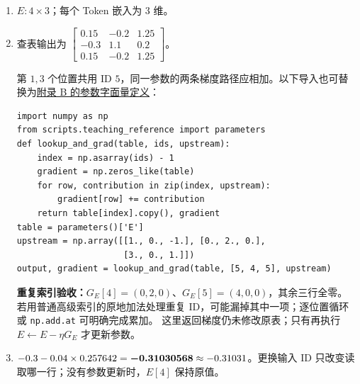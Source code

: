 \begin{enumerate}[label={},leftmargin=4.8em,itemsep=4pt]
\item[\textbf{\hyperref[exercise:embedding-shape]{C-048.}}] \leavevmode{}\label{solution:C-048}\label{solution:embedding-shape}$E:4\times3$；每个 Token 嵌入为 3 维。
\item[\textbf{\hyperref[exercise:embedding-input-change]{C-049.}}] \leavevmode{}\label{solution:C-049}\label{solution:embedding-input-change}查表输出为 $\left[\begin{smallmatrix}0.15&-0.2&1.25\\-0.3&1.1&0.2\\0.15&-0.2&1.25\end{smallmatrix}\right]$。
\par{}第 $1,3$ 个位置共用 ID $5$，同一参数的两条梯度路径应相加。以下导入也可替换为\hyperref[app:parameter-literal]{附录 B 的参数字面量定义}：\par\nobreak
\begin{samepage}\begin{verbatim}
import numpy as np
from scripts.teaching_reference import parameters
def lookup_and_grad(table, ids, upstream):
    index = np.asarray(ids) - 1
    gradient = np.zeros_like(table)
    for row, contribution in zip(index, upstream):
        gradient[row] += contribution
    return table[index].copy(), gradient
table = parameters()['E']
upstream = np.array([[1., 0., -1.], [0., 2., 0.],
                     [3., 0., 1.]])
output, gradient = lookup_and_grad(table, [5, 4, 5], upstream)
\end{verbatim}\end{samepage}
\textbf{重复索引验收：}$G_E[4]=(0,2,0)$、$G_E[5]=(4,0,0)$，其余三行全零。
若用普通高级索引的原地加法处理重复 ID，可能漏掉其中一项；逐位置循环或 \texttt{np.add.at} 可明确完成累加。
这里返回梯度仍未修改原表；只有再执行 $E\leftarrow E-\eta G_E$ 才更新参数。
\item[\textbf{\hyperref[exercise:embedding-update]{C-050.}}] \leavevmode{}\label{solution:C-050}\label{solution:embedding-update}$-0.3-0.04\times0.257642=\boldsymbol{-0.31030568}\approx-0.31031$。更换输入 ID 只改变读取哪一行；没有参数更新时，$E[4]$ 保持原值。
\end{enumerate}
